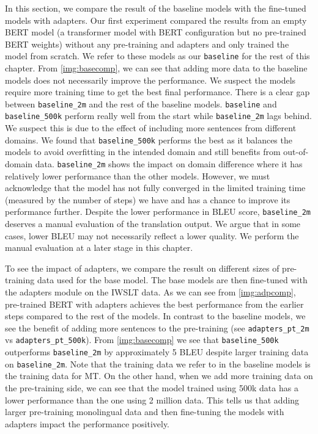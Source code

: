 In this section, we compare the result of the baseline models with the fine-tuned models with adapters. Our first experiment compared the results from an empty BERT model (a transformer model with BERT configuration but no pre-trained BERT weights) without any pre-training and adapters and only trained the model from scratch. We refer to these models as our \texttt{baseline} for the rest of this chapter. From \cref{img:basecomp}, we can see that adding more data to the baseline models does not necessarily improve the performance. We suspect the models require more training time to get the best final performance. There is a clear gap between \texttt{baseline\_2m} and the rest of the baseline models. \texttt{baseline} and \texttt{baseline\_500k} perform really well from the start while \texttt{baseline\_2m} lags behind. We suspect this is due to the effect of including more sentences from different domains. We found that \texttt{baseline\_500k} performs the best as it balances the models to avoid overfitting in the intended domain and still benefits from out-of-domain data. \texttt{baseline\_2m} shows the impact on domain difference where it has relatively lower performance than the other models. However, we must acknowledge that the model has not fully converged in the limited training time (measured by the number of steps) we have and has a chance to improve its performance further. Despite the lower performance in BLEU score, \texttt{baseline\_2m} deserves a manual evaluation of the translation output. We argue that in some cases, lower BLEU may not necessarily reflect a lower quality. We perform the manual evaluation at a later stage in this chapter.

To see the impact of adapters, we compare the result on different sizes of pre-training data used for the base model. The base models are then fine-tuned with the adapters module on the IWSLT data. As we can see from \cref{img:adpcomp}, pre-trained BERT with adapters achieves the best performance from the earlier steps compared to the rest of the models. In contrast to the baseline models, we see the benefit of adding more sentences to the pre-training (see \texttt{adapters\_pt\_2m} vs \texttt{adapters\_pt\_500k}). From \cref{img:basecomp} we see that \texttt{baseline\_500k} outperforms \texttt{baseline\_2m} by approximately 5 BLEU despite larger training data on \texttt{baseline\_2m}. Note that the training data we refer to in the baseline models is the training data for MT. On the other hand, when we add more training data on the pre-training side, we can see that the model trained using 500k data has a lower performance than the one using 2 million data. This tells us that adding larger pre-training monolingual data and then fine-tuning the models with adapters impact the performance positively.

